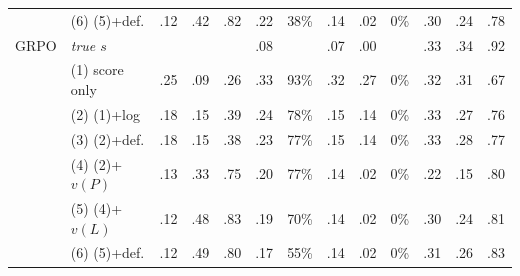\begin{tabular}{@{}llccccccccccc@{}}
 & (6) (5)+def. & .12 & .42 & .82 & .22 & 38\% & .14 & .02 & 0\% & .30 & .24 & .78 \\
\cmidrule(lr){1-13}
GRPO & \emph{true $s$} & & & & .08 & & .07 & .00 & & .33 & .34 & .92 \\
 & (1) score only & .25 & .09 & .26 & .33 & 93\% & .32 & .27 & 0\% & .32 & .31 & .67 \\
 & (2) (1)+log & .18 & .15 & .39 & .24 & 78\% & .15 & .14 & 0\% & .33 & .27 & .76 \\
 & (3) (2)+def. & .18 & .15 & .38 & .23 & 77\% & .15 & .14 & 0\% & .33 & .28 & .77 \\
 & (4) (2)+$v(P)$ & .13 & .33 & .75 & .20 & 77\% & .14 & .02 & 0\% & .22 & .15 & .80 \\
 & (5) (4)+$v(L)$ & .12 & .48 & .83 & .19 & 70\% & .14 & .02 & 0\% & .30 & .24 & .81 \\
 & (6) (5)+def. & .12 & .49 & .80 & .17 & 55\% & .14 & .02 & 0\% & .31 & .26 & .83 \\
\bottomrule
\end{tabular}
